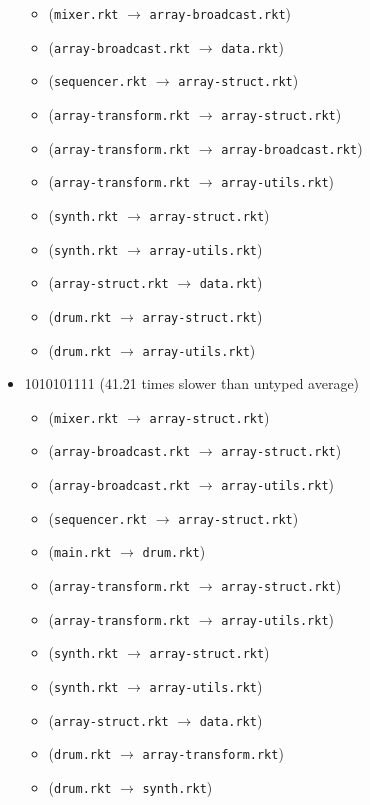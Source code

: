 \documentclass{article}
\newcommand{\mono}[1]{\texttt{#1}}
\begin{document}
\begin{itemize}
\begin{itemize}
  \item (\mono{mixer.rkt} $\rightarrow$ \mono{array-broadcast.rkt})
  \item (\mono{array-broadcast.rkt} $\rightarrow$ \mono{data.rkt})
  \item (\mono{sequencer.rkt} $\rightarrow$ \mono{array-struct.rkt})
  \item (\mono{array-transform.rkt} $\rightarrow$ \mono{array-struct.rkt})
  \item (\mono{array-transform.rkt} $\rightarrow$ \mono{array-broadcast.rkt})
  \item (\mono{array-transform.rkt} $\rightarrow$ \mono{array-utils.rkt})
  \item (\mono{synth.rkt} $\rightarrow$ \mono{array-struct.rkt})
  \item (\mono{synth.rkt} $\rightarrow$ \mono{array-utils.rkt})
  \item (\mono{array-struct.rkt} $\rightarrow$ \mono{data.rkt})
  \item (\mono{drum.rkt} $\rightarrow$ \mono{array-struct.rkt})
  \item (\mono{drum.rkt} $\rightarrow$ \mono{array-utils.rkt})
  \end{itemize}
\item 1010101111 (41.21 times slower than untyped average)
  \begin{itemize}
  \item (\mono{mixer.rkt} $\rightarrow$ \mono{array-struct.rkt})
  \item (\mono{array-broadcast.rkt} $\rightarrow$ \mono{array-struct.rkt})
  \item (\mono{array-broadcast.rkt} $\rightarrow$ \mono{array-utils.rkt})
  \item (\mono{sequencer.rkt} $\rightarrow$ \mono{array-struct.rkt})
  \item (\mono{main.rkt} $\rightarrow$ \mono{drum.rkt})
  \item (\mono{array-transform.rkt} $\rightarrow$ \mono{array-struct.rkt})
  \item (\mono{array-transform.rkt} $\rightarrow$ \mono{array-utils.rkt})
  \item (\mono{synth.rkt} $\rightarrow$ \mono{array-struct.rkt})
  \item (\mono{synth.rkt} $\rightarrow$ \mono{array-utils.rkt})
  \item (\mono{array-struct.rkt} $\rightarrow$ \mono{data.rkt})
  \item (\mono{drum.rkt} $\rightarrow$ \mono{array-transform.rkt})
  \item (\mono{drum.rkt} $\rightarrow$ \mono{synth.rkt})

\end{itemize}
\end{itemize}
\end{document}
